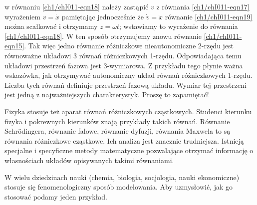 \documentclass[a4paper,12pt,polish]{sphinxmanual}
\begin{document}
w równaniu  \eqref{ch1/chI011-eqn18}  należy zastąpić $v$   z równania \eqref{ch1/chI011-eqn17} wyrażeniem   $v=\dot x$ pamiętając jednocześnie że $\dot v = \ddot x$
równanie \eqref{ch1/chI011-eqn19} można scałkować i otrzymamy $z=\omega t$; wstawiamy to wyrażenie do równania \eqref{ch1/chI011-eqn18}.
W ten sposób otrzymujemy znowu równanie \eqref{ch1/chI011-eqn15}. Tak więc jedno równanie różniczkowe nieautonomiczne 2-rzędu jest równoważne układowi 3 równań różniczkowych 1-rzędu. Odpowiadająca temu układowi przestrzeń fazowa jest 3-wymiarowa.  Z przykładu tego płynie ważna wskazówka, jak otrzymywać autonomiczny układ równań różniczkowych 1-rzędu. Liczba tych równań definiuje przestrzeń fazową układu. Wymiar tej przestrzeni jest jedną z najważniejszych charakterystyk. Proszę to zapamiętać!

Fizyka stosuje też aparat równań różniczkowych cząstkowych. Studenci kierunku fizyka i pokrewnych kierunków znają przykłady takich równań. Równanie Schrödingera, równanie falowe, równanie dyfuzji, równania Maxwela to są równania różniczkowe cząstkowe. Ich analiza jest znacznie trudniejsza. Istnieją specjalne i specyficzne  metody matematyczne pozwalające otrzymać informację o własnościach układów opisywanych takimi równaniami.

W wielu dziedzinach nauki (chemia, biologia, socjologia, nauki ekonomiczne) stosuje się fenomenologiczny sposób modelowania.  Aby uzmysłowić, jak go stosować podamy jeden przykład.
\end{document}
